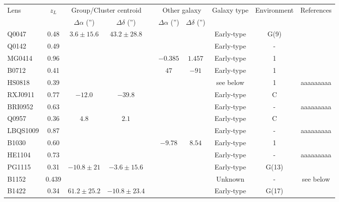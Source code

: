 \documentclass[10pt]{article}
\begin{document}
\begin{landscape}
 \begin{center}
  \begin{tabular}{l c c c c c c c c c}
	\hline
	\multirow{2}{*}{Lens} & \multirow{2}{*}{$z_{L}$} & \multicolumn{2}{c}{Group/Cluster centroid} & & \multicolumn{2}{c}{Other galaxy} & \multirow{2}{*}{Galaxy type} & \multirow{2}{*}{Environment} & \multirow{2}{*}{References}\\ \cline{3-4} \cline{6-7}
	 & & $\Delta\alpha$ ('') & $\Delta\delta$ ('') & & $\Delta\alpha$ ('') & $\Delta\delta$ ('') & & & \\ \hline \hline
	Q0047 & 0.48 & $3.6\pm15.6$ & $43.2\pm28.8$ &   & & & Early-type & G(9) & \cite{2011ApJ...726...84W}\\
	Q0142 & 0.49 & & &   & & & Early-type & - & \cite{2000ApJ...536..584L}\\
	MG0414 & 0.96 & & &   & $-0.385$ & $1.457$ & Early-type & 1 & \cite{1993AJ....105....1S}\\
	B0712 & 0.41 & & &   & $47$ & $-91$ & Early-type & 1 & \cite{2002AJ....123..627F}\\
	HS0818 & 0.39 & & &   & & & see below & 1 & aaaaaaaaa\\%
	RXJ0911 & 0.77 & $-12.0$ & $-39.8$ &    & & & Early-type & C & \cite{2001ApJ...555....1M}\\
	BRI0952 & 0.63 & &   & & & & Early-type & - & aaaaaaaaa\\%
	Q0957 & 0.36 & $4.8$ & $2.1$ &   & & & Early-type & C & \cite{1998ApJ...504..661C}\\
	LBQS1009 & 0.87 & & &   & & & Early-type & - & aaaaaaaaa\\%
	B1030 & 0.60 & & &   & $-9.78$ & $8.54$ & Early-type & 1 & \cite{2000ApJ...536..584L}\\
	HE1104 & 0.73 & & &   & & & Early-type & - & aaaaaaaaa\\%
	PG1115 & 0.31 & $-10.8\pm21$ & $-3.6\pm15.6$ &   & & & Early-type & G(13) & \cite{2011ApJ...726...84W}\\
	B1152 & 0.439 & & &   & & & Unknown & - & see below\\
	B1422 & 0.34 & $61.2\pm25.2$ & $-10.8\pm23.4$ &   & & & Early-type & G(17) & \cite{2011ApJ...726...84W}\\

\end{tabular}
\end{center}
\end{landscape}
\end{document}
